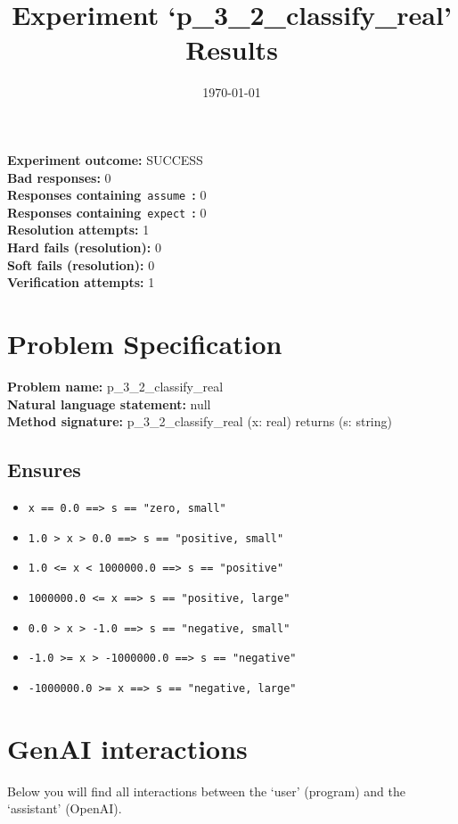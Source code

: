 \documentclass{article}
\begin{document}
\title{Experiment `p\_3\_2\_classify\_real' Results}
\author{\today}
\date{}
\maketitle
\textbf{Experiment outcome: }SUCCESS
\\\textbf{Bad responses: }0
\\\textbf{Responses containing}~\texttt{assume}~\textbf{: }0
\\\textbf{Responses containing}~\texttt{expect}~\textbf{: }0
\\\textbf{Resolution attempts: }1
\\\textbf{Hard fails (resolution): }0
\\\textbf{Soft fails (resolution): }0
\\\textbf{Verification attempts: }1
\section*{Problem Specification}
\textbf{Problem name: }p\_3\_2\_classify\_real
\\\textbf{Natural language statement: }null
\\\textbf{Method signature: }p\_3\_2\_classify\_real (x: real) returns (s: string)
\subsection*{Ensures}
\begin{itemize}
\item \texttt{x == 0.0 ==> s == "zero, small"}
\item \texttt{1.0 > x > 0.0 ==> s == "positive, small"}
\item \texttt{1.0 <= x < 1000000.0 ==> s == "positive"}
\item \texttt{1000000.0 <= x  ==> s == "positive, large"}
\item \texttt{0.0 > x > -1.0 ==> s == "negative, small"}
\item \texttt{-1.0 >= x > -1000000.0 ==> s == "negative"}
\item \texttt{-1000000.0 >= x ==> s == "negative, large"}
\end{itemize}
\clearpage
\section*{GenAI interactions}
Below you will find all interactions between the `user' (program) and the `assistant' (OpenAI).
\end{document}
